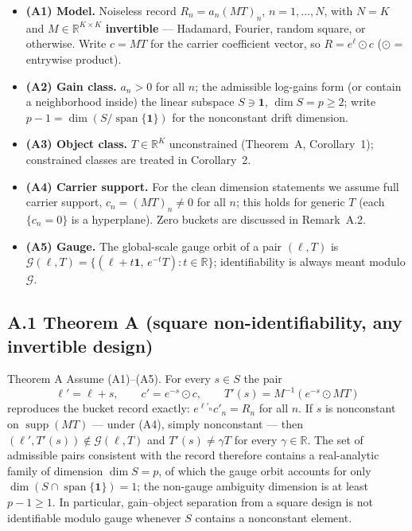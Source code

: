 \begin{itemize}
\item \textbf{(A1) Model.} Noiseless record $R_n = a_n(MT)_n$, $n = 1,\dots,N$, with $N = K$ and $M \in \mathbb{R}^{K\times K}$ \textbf{invertible} --- Hadamard, Fourier, random square, or otherwise. Write $c = MT$ for the carrier coefficient vector, so $R = e^{\ell}\odot c$ ($\odot$ = entrywise product).
\item \textbf{(A2) Gain class.} $a_n > 0$ for all $n$; the admissible log-gains form (or contain a neighborhood inside) the linear subspace $S \ni \mathbf 1$, $\dim S = p \ge 2$; write $p - 1 = \dim(S/\operatorname{span}\{\mathbf 1\})$ for the nonconstant drift dimension.
\item \textbf{(A3) Object class.} $T \in \mathbb{R}^K$ unconstrained (Theorem~A, Corollary~1); constrained classes are treated in Corollary~2.
\item \textbf{(A4) Carrier support.} For the clean dimension statements we assume full carrier support, $c_n = (MT)_n \neq 0$ for all $n$; this holds for generic $T$ (each $\{c_n = 0\}$ is a hyperplane). Zero buckets are discussed in Remark~A.2.
\item \textbf{(A5) Gauge.} The global-scale gauge orbit of a pair $(\ell, T)$ is $\mathcal G(\ell,T) = \{(\ell + t\mathbf 1,\, e^{-t}T) : t \in \mathbb{R}\}$; identifiability is always meant modulo $\mathcal G$.
\end{itemize}

\subsection{A.1 Theorem A (square non-identifiability, any invertible design)}

\begin{namedthm}{Theorem A}
Assume (A1)--(A5). For every $s \in S$ the pair
\[
\ell' = \ell + s, \qquad c' = e^{-s}\odot c, \qquad T'(s) = M^{-1}\!\left(e^{-s}\odot MT\right)
\]
reproduces the bucket record exactly: $e^{\ell'_n} c'_n = R_n$ for all $n$. If $s$ is nonconstant on $\operatorname{supp}(MT)$ --- under (A4), simply nonconstant --- then $(\ell', T'(s)) \notin \mathcal G(\ell, T)$ and $T'(s) \neq \gamma T$ for every $\gamma \in \mathbb{R}$. The set of admissible pairs consistent with the record therefore contains a real-analytic family of dimension $\dim S = p$, of which the gauge orbit accounts for only $\dim(S \cap \operatorname{span}\{\mathbf 1\}) = 1$; the non-gauge ambiguity dimension is at least $p - 1 \ge 1$. In particular, gain--object separation from a square design is not identifiable modulo gauge whenever $S$ contains a nonconstant element.
\end{namedthm}

